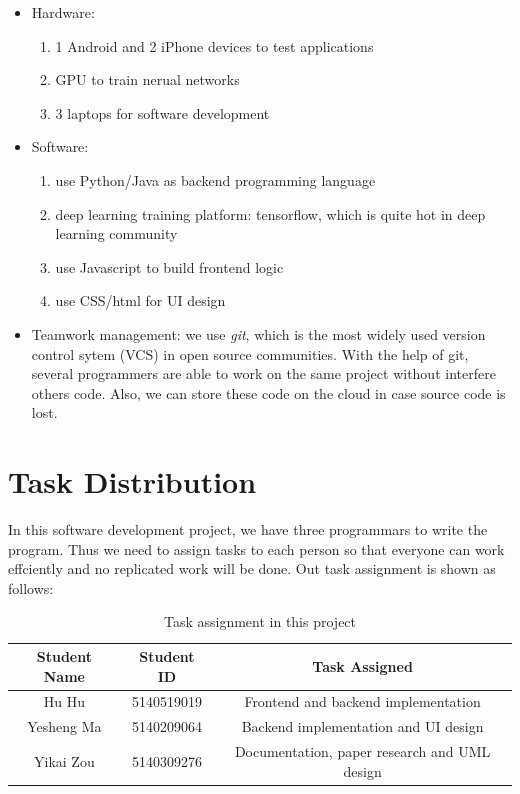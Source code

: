 \documentclass[12pt]{article}
\begin{document}
\begin{itemize}
\item Hardware:
\begin{enumerate}
\item 1 Android and 2 iPhone devices to test applications
\item GPU to train nerual networks
\item 3 laptops for software development
\end{enumerate}

\item Software:
\begin{enumerate}
\item use Python/Java as backend programming language
\item deep learning training platform: tensorflow, which is quite hot in deep learning community
\item use Javascript to build frontend logic
\item use CSS/html for UI design
\end{enumerate}

\item Teamwork management: we use \textsl{git}, which is the most widely used version control sytem (VCS) in open source communities. With the help of git, several programmers are able to work on the same project without interfere others code. Also, we can store these code on the cloud in case source code is lost.

\end{itemize}

\section{Task Distribution}
In this software development project, we have three programmars to write the program. Thus we need to assign tasks to each person so that everyone can work effciently and no replicated work will be done. Out task assignment is shown as follows:
\begin{table}[H]
	\centering
	\begin{tabular}{|c|c|c|}
		\hline
		Student Name & Student ID & Task Assigned \\
		\hline
		Hu Hu & 5140519019 & Frontend and  backend implementation  \\
		\hline
		Yesheng Ma & 5140209064 & Backend implementation and UI design\\
		\hline
		Yikai Zou & 5140309276 & Documentation, paper research and UML design\\
		\hline
	\end{tabular}
	\caption{Task assignment in this project}
\end{table}
\end{document}
